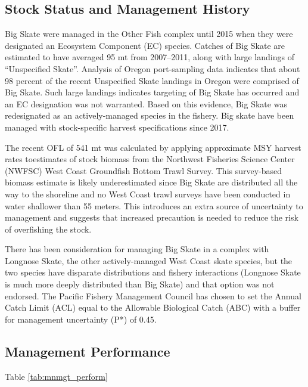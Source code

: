\documentclass[12pt,]{article}
\begin{document}
\hypertarget{stock-status-and-management-history}{%
\subsection{Stock Status and Management
History}\label{stock-status-and-management-history}}

Big Skate were managed in the Other Fish complex until 2015 when they
were designated an Ecosystem Component (EC) species. Catches of Big
Skate are estimated to have averaged 95 mt from 2007--2011, along with
large landings of ``Unspecified Skate''. Analysis of Oregon
port-sampling data indicates that about 98 percent of the recent
Unspecified Skate landings in Oregon were comprised of Big Skate. Such
large landings indicates targeting of Big Skate has occurred and an EC
designation was not warranted. Based on this evidence, Big Skate was
redesignated as an actively-managed species in the fishery. Big skate
have been managed with stock-specific harvest specifications since 2017.

The recent OFL of 541 mt was calculated by applying approximate MSY
harvest rates toestimates of stock biomass from the Northwest Fisheries
Science Center (NWFSC) West Coast Groundfish Bottom Trawl Survey. This
survey-based biomass estimate is likely underestimated since Big Skate
are distributed all the way to the shoreline and no West Coast trawl
surveys have been conducted in water shallower than 55 meters. This
introduces an extra source of uncertainty to management and suggests
that increased precaution is needed to reduce the risk of overfishing
the stock.

There has been consideration for managing Big Skate in a complex with
Longnose Skate, the other actively-managed West Coast skate species, but
the two species have disparate distributions and fishery interactions
(Longnose Skate is much more deeply distributed than Big Skate) and that
option was not endorsed. The Pacific Fishery Management Council has
chosen to set the Annual Catch Limit (ACL) equal to the Allowable
Biological Catch (ABC) with a buffer for management uncertainty (P*) of
0.45.

\hypertarget{management-performance-1}{%
\subsection{Management Performance}\label{management-performance-1}}

Table \ref{tab:mnmgt_perform}
\end{document}
